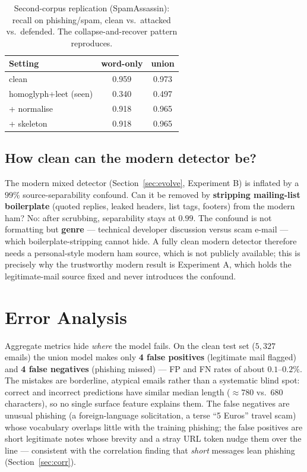\documentclass[11pt]{article}
\begin{document}
\begin{table}[t]
\centering
\caption{Second-corpus replication (SpamAssassin): recall on phishing/spam, clean vs.\ attacked vs.\
defended. The collapse-and-recover pattern reproduces.}
\label{tab:spamassassin}
\begin{tabular}{lcc}
\toprule
Setting & word-only & union \\
\midrule
clean                 & 0.959 & 0.973 \\
homoglyph+leet (seen) & 0.340 & 0.497 \\
\quad + normalise     & 0.918 & 0.965 \\
\quad + skeleton      & 0.918 & 0.965 \\
\bottomrule
\end{tabular}
\end{table}

\subsection{How clean can the modern detector be?}
\label{sec:confoundscrub}
The modern mixed detector (Section~\ref{sec:evolve}, Experiment B) is inflated by a $99\%$
source-separability confound. Can it be removed by \textbf{stripping mailing-list boilerplate} (quoted
replies, leaked headers, list tags, footers) from the modern ham? No: after scrubbing, separability
stays at $0.99$. The confound is not formatting but \textbf{genre} --- technical developer discussion
versus scam e-mail --- which boilerplate-stripping cannot hide. A fully clean modern detector therefore
needs a personal-style modern ham source, which is not publicly available; this is precisely why the
trustworthy modern result is Experiment A, which holds the legitimate-mail source fixed and never
introduces the confound.

\section{Error Analysis}
\label{sec:error}
Aggregate metrics hide \emph{where} the model fails. On the clean test set
($5{,}327$ emails) the union model makes only \textbf{4 false positives}
(legitimate mail flagged) and \textbf{4 false negatives} (phishing missed) --- FP and
FN rates of about $0.1$--$0.2\%$. The mistakes are borderline, atypical emails rather
than a systematic blind spot: correct and incorrect predictions have similar median
length ($\approx$780 vs.\ 680 characters), so no single surface feature explains them.
The false negatives are unusual phishing (a foreign-language solicitation, a terse
``5 Euros'' travel scam) whose vocabulary overlaps little with the training phishing;
the false positives are short legitimate notes whose brevity and a stray URL token
nudge them over the line --- consistent with the correlation finding that
\emph{short} messages lean phishing (Section~\ref{sec:corr}).
\end{document}
